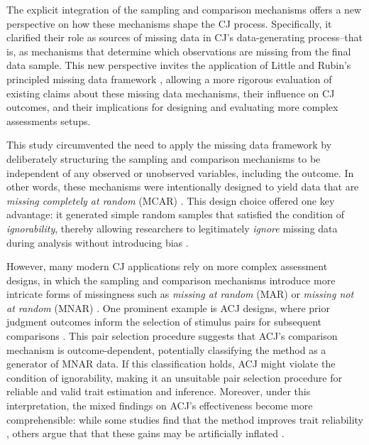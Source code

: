 \documentclass[
  authoryear,
  review,
  1p]{elsarticle}
\begin{document}
The explicit integration of the sampling and comparison mechanisms
offers a new perspective on how these mechanisms shape the CJ process.
Specifically, it clarified their role as sources of missing data in CJ's
data-generating process--that is, as mechanisms that determine which
observations are missing from the final data sample. This new
perspective invites the application of Little and Rubin's principled
missing data framework \citep{Little_et_al_2020}, allowing a more
rigorous evaluation of existing claims about these missing data
mechanisms, their influence on CJ outcomes, and their implications for
designing and evaluating more complex assessments setups.

This study circumvented the need to apply the missing data framework by
deliberately structuring the sampling and comparison mechanisms to be
independent of any observed or unobserved variables, including the
outcome. In other words, these mechanisms were intentionally designed to
yield data that are \emph{missing completely at random} (MCAR)
\citep{Little_et_al_2020}. This design choice offered one key advantage:
it generated simple random samples that satisfied the condition of
\emph{ignorability}, thereby allowing researchers to legitimately
\emph{ignore} missing data during analysis without introducing bias
\citep{Everitt_et_al_2010, Kohler_et_al_2019, Neal_2020}.

However, many modern CJ applications rely on more complex assessment
designs, in which the sampling and comparison mechanisms introduce more
intricate forms of missingness such as \emph{missing at random} (MAR) or
\emph{missing not at random} (MNAR) \citep{Little_et_al_2020}. One
prominent example is ACJ designs, where prior judgment outcomes inform
the selection of stimulus pairs for subsequent comparisons
\citep{Pollitt_2012a, Pollitt_2012b, Bramley_2015}. This pair selection
procedure suggests that ACJ's comparison mechanism is outcome-dependent,
potentially classifying the method as a generator of MNAR data. If this
classification holds, ACJ might violate the condition of ignorability,
making it an unsuitable pair selection procedure for reliable and valid
trait estimation and inference. Moreover, under this interpretation, the
mixed findings on ACJ's effectiveness become more comprehensible: while
some studies find that the method improves trait reliability
\citep{Pollitt_et_al_2003, Pollitt_2012a, Pollitt_2012b}, others argue
that that these gains may be artificially inflated
\citep{Bramley_2015, Bramley_et_al_2019, Crompvoets_et_al_2020, Crompvoets_et_al_2022}.
\end{document}
